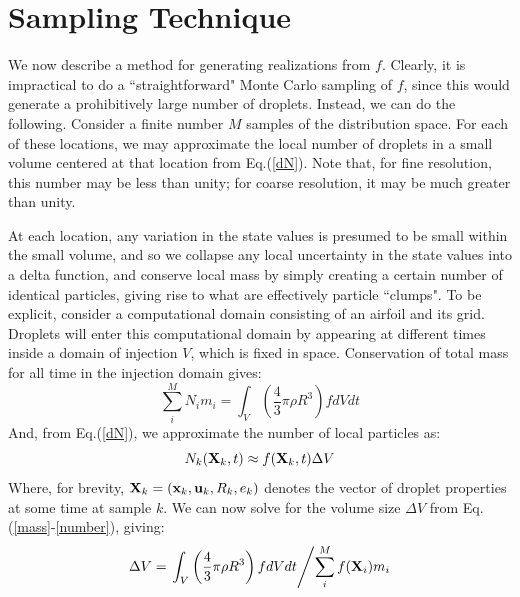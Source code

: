 \documentclass{article}
\begin{document}
\section{Sampling Technique}
We now describe a method for generating realizations from $f$. Clearly, it is impractical to do a ``straightforward"
Monte Carlo sampling of $f$, since this would generate a prohibitively large number of droplets. Instead, we can do 
the following. Consider a finite number $M$ samples of the distribution space. For each of these locations, we may 
approximate the local number of droplets in a small volume centered at that location from Eq.(\ref{dN}). Note that, 
for fine resolution, this number may be less than unity; for coarse resolution, it may be much greater than unity. 

At each location, any variation in the state values is presumed to be small within the small volume, and so we collapse 
any local uncertainty in the state values into a delta function, and conserve local mass by 
simply creating a certain number of identical particles, giving rise to what are effectively particle ``clumps". 
To be explicit, consider a computational domain consisting of 
an airfoil and its grid. Droplets will enter this computational domain by appearing at different times inside a domain 
of injection $V$, which is fixed in space. Conservation of total mass for all time in the injection domain gives:
\begin{equation}
\label{mass}
\sum_i^M N_i m_i = \int_V \left(\frac{4}{3} \pi \rho R^3\right) f dV dt
\end{equation}
And, from Eq.(\ref{dN}), we approximate the number of local particles as:
\begin{equation}
\label{number}
N_k({\bf X}_k,t) \approx f({\bf X}_k,t) \Delta V
\end{equation}
Where, for brevity, ${\bf X}_k = ({\bf x}_k, {\bf u}_k, R_k, e_k)$ denotes the vector of droplet properties at some time at sample $k$.
We can now solve for the volume size $\Delta V$ from Eq.(\ref{mass}-\ref{number}), giving:
\begin{equation}
\Delta V = \left. \int_V \left(\frac{4}{3} \pi \rho R^3\right) f dV dt \middle/ \sum_i^M f({\bf X}_i) m_i \right.
\end{equation}
\end{document}
